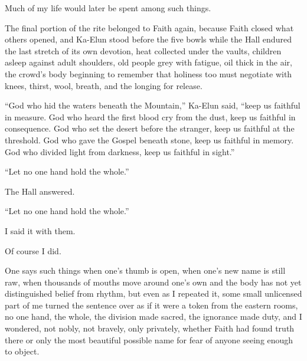 Much of my life would later be spent among such things.\par


The final portion of the rite belonged to Faith again, because Faith closed what others opened, and Ka-Elun stood before the five bowls while the Hall endured the last stretch of its own devotion, heat collected under the vaults, children asleep against adult shoulders, old people grey with fatigue, oil thick in the air, the crowd’s body beginning to remember that holiness too must negotiate with knees, thirst, wool, breath, and the longing for release.\par

\begin{scripture}
“God who hid the waters beneath the Mountain,” Ka-Elun said, “keep us faithful in measure.
God who heard the first blood cry from the dust, keep us faithful in consequence.
God who set the desert before the stranger, keep us faithful at the threshold.
God who gave the Gospel beneath stone, keep us faithful in memory. God who divided light from darkness,
keep us faithful in sight.”
\end{scripture}

\begin{scripture}
“Let no one hand hold the whole.”
\end{scripture}

The Hall answered.\par

“Let no one hand hold the whole.”\par

I said it with them.\par

Of course I did.\par

One says such things when one’s thumb is open, when one’s new name is still raw, when thousands of mouths move around one’s own and the body has not yet distinguished belief from rhythm, but even as I repeated it, some small unlicensed part of me turned the sentence over as if it were a token from the eastern rooms, no one hand, the whole, the division made sacred, the ignorance made duty, and I wondered, not nobly, not bravely, only privately, whether Faith had found truth there or only the most beautiful possible name for fear of anyone seeing enough to object.\par

